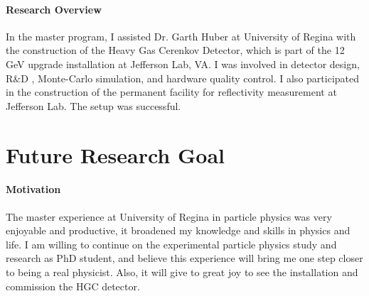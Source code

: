 \documentclass[12pt, letterpaper]{article}
\begin{document}
\paragraph{Research Overview}
In the master program, I assisted Dr. Garth Huber at University of Regina with the construction of the Heavy Gas Cerenkov Detector, which is part of the 12 GeV upgrade installation at Jefferson Lab, VA. I was involved in detector design, R\&D , Monte-Carlo simulation, and hardware quality control. I also participated in the construction of the permanent facility for reflectivity measurement at Jefferson Lab. The setup was successful. 


 



\section*{Future Research Goal}
\paragraph{Motivation} The master experience at University of Regina in particle physics was very enjoyable and productive, it broadened my knowledge and skills in physics and life. I am willing to continue on the experimental particle physics study and research as PhD student, and believe this experience will bring me one step closer to being a real physicist. Also, it will give to great joy to see the installation and commission the HGC detector.  



\end{document}
